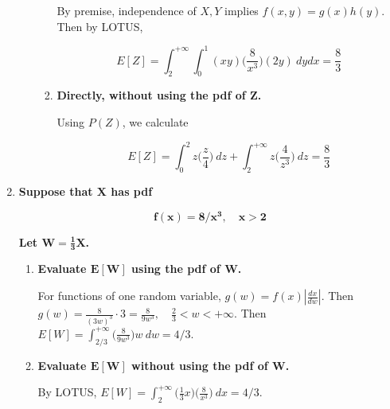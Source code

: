\documentclass[10pt, oneside]{article}   	%
\theoremstyle{definition}
\begin{document}
\begin{enumerate}[label=7.\arabic*]
\begin{enumerate}
\begin{enumerate}
		By premise, independence of $X,Y$ implies $f(x,y) = g(x) h(y)$. Then by LOTUS,
		
		\[ E[Z] = \int^{+\infty}_2 \int^1_0 (xy) \Big( \frac{8}{x^3} \Big) (2y) \ dy dx = \boxed{\frac{8}{3}} \]
		
		\item  \begin{tcolorbox}[
		  colback=Cerulean!5!white,
		  colframe=Cerulean!75!black]
		\textbf{Directly, without using the pdf of $\bm{Z}$.}
		\end{tcolorbox}
		
		Using $P(Z)$, we calculate
		
		\[ E[Z] = \int^2_0 z \Big( \frac{z}{4} \Big) \ dz + \int^{+\infty}_2 z \Big( \frac{4}{z^3} \Big) \ dz = \boxed{\frac{8}{3}} \]
		
		\end{enumerate}
	\end{enumerate}

\item  \begin{tcolorbox}[
  colback=Cerulean!5!white,
  colframe=Cerulean!75!black]
  \textbf{Suppose that $\bm{X}$ has pdf}
  
  \[ \bm{ f(x) = 8/x^3, \quad x > 2} \]
  
  \textbf{Let $\bm{W = \frac{1}{3}X}$.}
\end{tcolorbox}

	\begin{enumerate}
	\item  \begin{tcolorbox}[
	  colback=Cerulean!5!white,
	  colframe=Cerulean!75!black]
	\textbf{Evaluate $\bm{E[W]}$ using the pdf of $\bm{W}$.}
	\end{tcolorbox}

	For functions of one random variable, $g(w) = f(x) | \frac{dx}{dw} |$. Then $g(w) = \frac{8}{(3w)^3} \cdot 3 = \frac{8}{9w^3}, \quad \frac{2}{3} < w < +\infty$. Then $E[W] = \int^{+\infty}_{2/3} \big( \frac{8}{9w^3} \big) w \ dw = \boxed{4/3}$.
	
	\item  \begin{tcolorbox}[
	  colback=Cerulean!5!white,
	  colframe=Cerulean!75!black]
	\textbf{Evaluate $\bm{E[W]}$ without using the pdf of $\bm{W}$.}
	\end{tcolorbox}
	
	By LOTUS, $E[W] = \int^{+\infty}_2 \big( \frac{1}{3}x \big) \big( \frac{8}{x^3} \big) \ dx = \boxed{4/3}$.
	\end{enumerate}


\end{enumerate}
\end{document}
